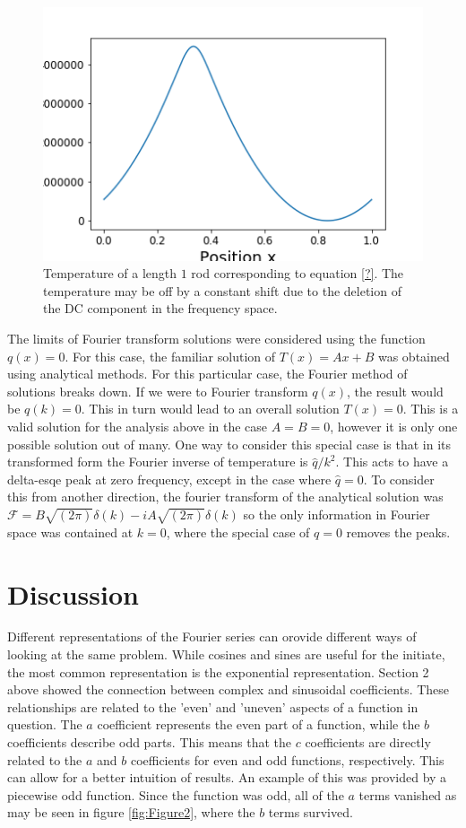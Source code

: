 \documentclass[twocolumn]{article}
\begin{document}
\begin{figure}
\centering
\includegraphics[width=\linewidth]{temp}
\caption{Temperature of a length $1$ rod corresponding to equation \ref{?}. The temperature may be off by a constant shift due to the deletion of the DC component in the frequency space.}
\label{fig:temp}
\end{figure}

The limits of Fourier transform solutions were considered using the function $q(x) = 0$. For this case, the familiar solution of $T(x) = Ax + B$ was obtained using analytical methods. For this particular case, the Fourier method of solutions breaks down. If we were to Fourier transform $q(x)$, the result would be $q(k)=0$. This in turn would lead to an overall solution $T(x) = 0$. This is a valid solution for the analysis above in the case $A=B=0$, however it is only one possible solution out of many. One way to consider this special case is that in its transformed form the Fourier inverse of temperature is $\hat{q}/k^2$. This acts to have a delta-esqe peak at zero frequency, except in the case where $\hat{q}=0$. To consider this from another direction, the fourier transform of the analytical solution was $\mathcal{F} = B\sqrt{(2\pi)}\delta (k) - iA\sqrt{(2\pi)}\delta(k)$ so the only information in Fourier space was contained at $k=0$, where the special case of $q=0$ removes the peaks.

\section{Discussion}
Different representations of the Fourier series can orovide different ways of looking at the same problem. While cosines and sines are useful for the initiate, the most common representation is the exponential representation. Section 2 above showed the connection between complex and sinusoidal coefficients. These relationships are related to the 'even' and 'uneven' aspects of a function in question. The $a$ coefficient represents the even part of a function, while the $b$ coefficients describe odd parts. This means that the $c$ coefficients are directly related to the $a$ and $b$ coefficients for even and odd functions, respectively. This can allow for a better intuition of results. An example of this was provided by a piecewise odd function. Since the function was odd, all of the $a$ terms vanished as may be seen in figure \ref{fig:Figure2}, where the $b$ terms survived.
\end{document}
